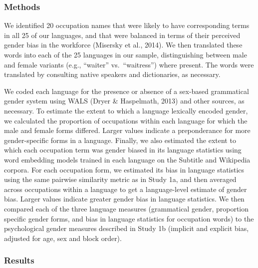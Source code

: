 \documentclass[man,floatsintext]{apa6}
\begin{document}
\hypertarget{methods-2}{%
\subsubsection{Methods}\label{methods-2}}

We identified 20 occupation names that were likely to have corresponding terms in all 25 of our languages,
and that were balanced in terms of their perceived gender bias in the workforce (Misersky et al., 2014). We then translated these words into each of the 25 languages in our sample, distinguishing between male and female variants (e.g., \enquote{waiter} vs.~\enquote{waitress}) where present. The words were translated by consulting native speakers and dictionaries, as necessary.

We coded each language for the presence or absence of a sex-based grammatical gender system using WALS (Dryer \& Haspelmath, 2013) and other sources, as necessary. To estimate the extent to which a language lexically encoded gender, we calculated the proportion of occupations within each language for which the male and female forms differed. Larger values indicate a preponderance for more gender-specific forms in a language. Finally, we also estimated the extent to which each occupation term was gender biased in its language statistics using word embedding models trained in each language on the Subtitle and Wikipedia corpora. For each occupation form, we estimated its bias in language statistics using the same pairwise similarity metric as in Study 1a, and then averaged across occupations within a language to get a language-level estimate of gender bias. Larger values indicate greater gender bias in language statistics. We then compared each of the three language measures (grammatical gender, proportion specific gender forms, and bias in language statistics for occupation words) to the psychological gender measures described in Study 1b (implicit and explicit bias, adjusted for age, sex and block order).

\hypertarget{results-4}{%
\subsubsection{Results}\label{results-4}}
\end{document}
